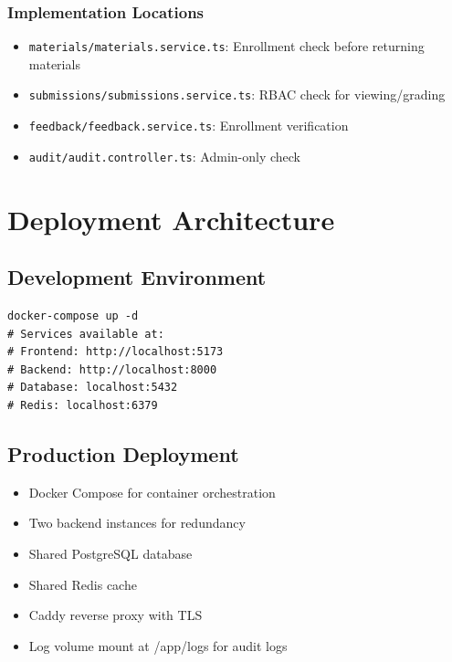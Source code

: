 \documentclass[12pt,oneside,a4paper]{article}
\begin{document}
\subsubsection{Implementation Locations}
\begin{itemize}
    \item \texttt{materials/materials.service.ts}: Enrollment check before returning materials
    \item \texttt{submissions/submissions.service.ts}: RBAC check for viewing/grading
    \item \texttt{feedback/feedback.service.ts}: Enrollment verification
    \item \texttt{audit/audit.controller.ts}: Admin-only check
\end{itemize}

\newpage

\section{Deployment Architecture}

\subsection{Development Environment}
\begin{lstlisting}
docker-compose up -d
# Services available at:
# Frontend: http://localhost:5173
# Backend: http://localhost:8000
# Database: localhost:5432
# Redis: localhost:6379
\end{lstlisting}

\subsection{Production Deployment}
\begin{itemize}
    \item Docker Compose for container orchestration
    \item Two backend instances for redundancy
    \item Shared PostgreSQL database
    \item Shared Redis cache
    \item Caddy reverse proxy with TLS
    \item Log volume mount at /app/logs for audit logs
\end{itemize}
\end{document}
